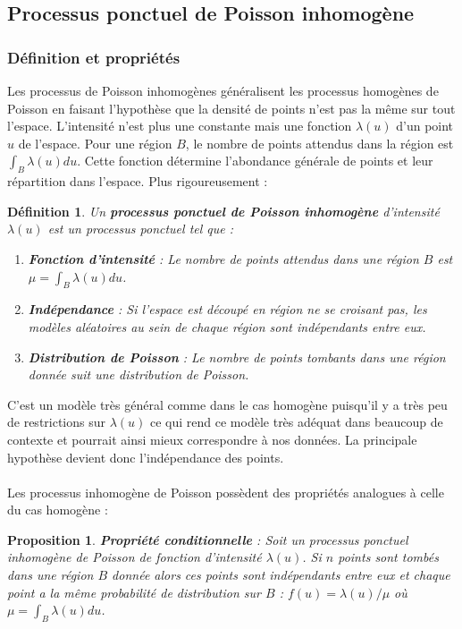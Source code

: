 \documentclass[12pt]{article}
\newtheorem{prop1}[thm1]{Proposition}
\newtheorem*{defin1}{Définition}
\begin{document}
\subsection{Processus ponctuel de Poisson inhomogène}
\subsubsection*{Définition et propriétés}
Les processus de Poisson inhomogènes généralisent les processus homogènes de Poisson en faisant l'hypothèse que la densité de points n'est pas la même sur tout l'espace. L'intensité n'est plus une constante mais une fonction $\lambda(u)$ d'un point $u$ de l'espace. Pour une région $B$, le nombre de points attendus dans la région est $\int_B \lambda(u) du$. Cette fonction détermine l'abondance générale de points et leur répartition dans l'espace. Plus rigoureusement :

\begin{defin1}
Un \textbf{processus ponctuel de Poisson inhomogène} d'intensité $\lambda(u)$ est un processus ponctuel tel que :
\begin{enumerate}
    \item \textbf{Fonction d'intensité} : Le nombre de points attendus dans une région $B$ est $\mu = \int_B \lambda(u) du$.\\
    \item \textbf{Indépendance} : Si l'espace est découpé en région ne se croisant pas, les modèles aléatoires au sein de chaque région sont indépendants entre eux.\\
    \item \textbf{Distribution de Poisson} : Le nombre de points tombants dans une région donnée suit une distribution de Poisson.
\end{enumerate}
\end{defin1}
C'est un modèle très général comme dans le cas homogène puisqu'il y a très peu de restrictions sur $\lambda(u)$ ce qui rend ce modèle très adéquat dans beaucoup de contexte et pourrait ainsi mieux correspondre à nos données. La principale hypothèse devient donc l'indépendance des points.\\
\\
Les processus inhomogène de Poisson possèdent des propriétés analogues à celle du cas homogène :

\begin{prop1}
    \textbf{Propriété conditionnelle} : Soit un processus ponctuel inhomogène de Poisson de fonction d'intensité $\lambda(u)$. Si $n$ points sont tombés dans une région $B$ donnée alors ces points sont indépendants entre eux et chaque point a la même probabilité de distribution sur $B$ : $f(u) = \lambda(u)/\mu$ où $\mu = \int_B \lambda(u) du$.
\end{prop1}
\end{document}

